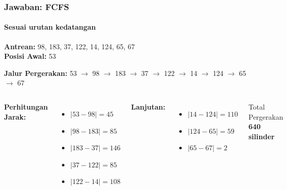 \documentclass[t,aspectratio=169,xcolor=dvipsnames]{beamer}
\begin{document}
\begin{frame}
    \frametitle{Jawaban: FCFS}
    \framesubtitle{Sesuai urutan kedatangan}
    \small
    \textbf{Antrean:} 98, 183, 37, 122, 14, 124, 65, 67\\
    \textbf{Posisi Awal:} 53
    
    \vspace{0.3cm}
    \textbf{Jalur Pergerakan:}
    53 $\rightarrow$ 98 $\rightarrow$ 183 $\rightarrow$ 37 $\rightarrow$ 122 $\rightarrow$ 14 $\rightarrow$ 124 $\rightarrow$ 65 $\rightarrow$ 67
    
    \vspace{0.3cm}
    \begin{columns}[T]
        \textbf{Perhitungan Jarak:}
        \begin{itemize}
            \item $|53 - 98| = 45$
            \item $|98 - 183| = 85$
            \item $|183 - 37| = 146$
            \item $|37 - 122| = 85$
            \item $|122 - 14| = 108$
        \end{itemize}
        
        \textbf{Lanjutan:}
        \begin{itemize}
            \item $|14 - 124| = 110$
            \item $|124 - 65| = 59$
            \item $|65 - 67| = 2$
        \end{itemize}
        
        \vspace{0.3cm}
        \begin{exampleblock}{Total Pergerakan}
            \textbf{640 silinder}
        \end{exampleblock}
    \end{columns}
\end{frame}
\end{document}
